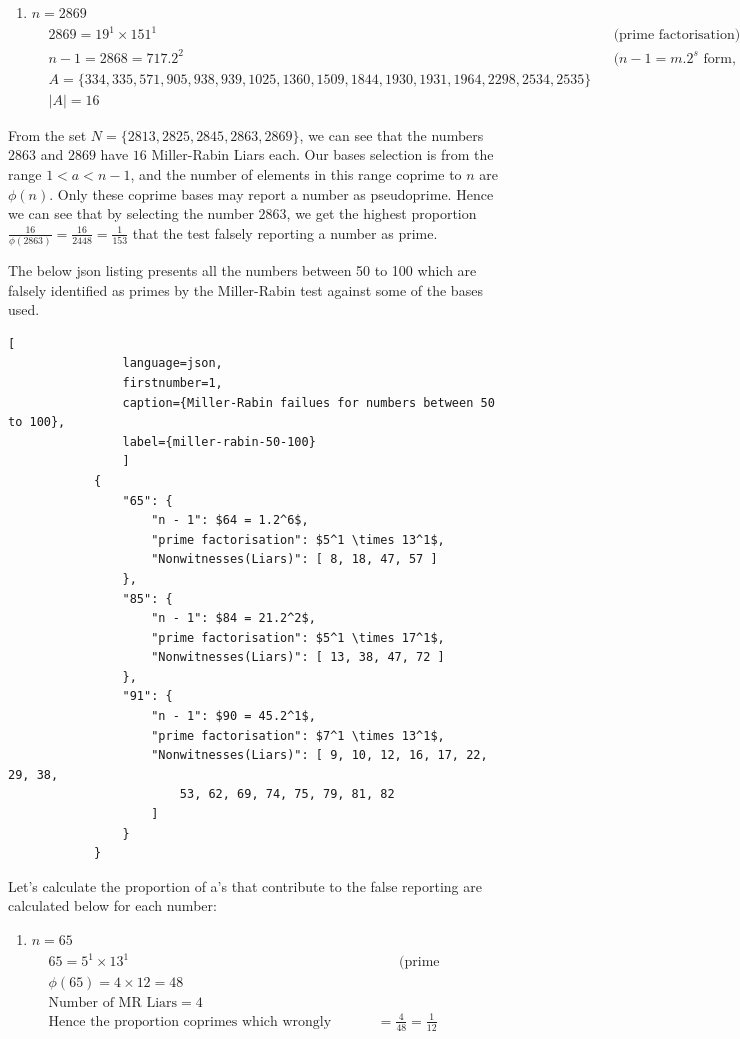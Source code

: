\documentclass[11pt,a4paper]{article}
\begin{document}
\begin{enumerate}[1.]
\begin{enumerate}[3.]
\begin{flushleft}
\begin{enumerate}[1.]
\begin{align}
					& |A| = 16 \nonumber
				\end{align}
				\item $n = 2869$
				\begin{align}
					& 2869 = 19^1 \times 151^1 &&\text{(prime factorisation)}\nonumber\\
					& n - 1 = 2868 = 717.2^2 &&\text{($n - 1 = m.2^s$ form, where $m = 717, s = 1$)}\nonumber\\
					& A = \{334, 335, 571, 905, 938, 939, 1025, 1360, 1509, 1844, 1930, 1931, 1964, 2298, 2534, 2535\} \nonumber\\
					& |A| = 16 \nonumber
				\end{align}
			\end{enumerate}
			
			From the set $N = \{2813, 2825, 2845, 2863, 2869\}$, we can see that the numbers $2863$ and $2869$ have $16$ Miller-Rabin Liars each. Our bases selection is from the range $1 < a < n - 1$, and the number of elements in this range coprime to $n$ are $\phi(n)$. Only these coprime bases may report a number as pseudoprime.  Hence we can see that by selecting the number $2863$, we get the highest proportion $\frac{16}{\phi(2863)} = \frac{16}{2448} = \frac{1}{153}$ that the test falsely reporting a number as prime.
			
			\bigbreak
			The below json listing presents all the numbers between 50 to 100 which are falsely identified as primes by the Miller-Rabin test against some of the bases used.
			
			\begin{lstlisting}[
				language=json,
				firstnumber=1,
				caption={Miller-Rabin failues for numbers between 50 to 100},
				label={miller-rabin-50-100}
				]
			{
				"65": {
					"n - 1": $64 = 1.2^6$,
					"prime factorisation": $5^1 \times 13^1$,
					"Nonwitnesses(Liars)": [ 8, 18, 47, 57 ]
				},
				"85": {
					"n - 1": $84 = 21.2^2$,
					"prime factorisation": $5^1 \times 17^1$,
					"Nonwitnesses(Liars)": [ 13, 38, 47, 72 ]
				},
				"91": {
					"n - 1": $90 = 45.2^1$,
					"prime factorisation": $7^1 \times 13^1$,
					"Nonwitnesses(Liars)": [ 9, 10, 12, 16, 17, 22, 29, 38, 
						53, 62, 69, 74, 75, 79, 81, 82
					]
				}
			}
			\end{lstlisting}
			
			Let's calculate the proportion of a's that contribute to the false reporting are calculated below for each number:
			
			\begin{enumerate}[1.]
				\item $n = 65$
				\begin{align}
					& 65 = 5^1 \times 13^1 &&\text{(prime factorisation)}\nonumber\\
					& \phi(65) = 4 \times 12 = 48 \nonumber\\
					& \text{Number of MR Liars} = 4\nonumber\\
					& \text{Hence the proportion coprimes which wrongly declares 65 as prime} = \frac{4}{48} = \frac{1}{12} \nonumber
				\end{align}
				

\end{enumerate}
\end{flushleft}
\end{enumerate}
\end{enumerate}
\end{document}
